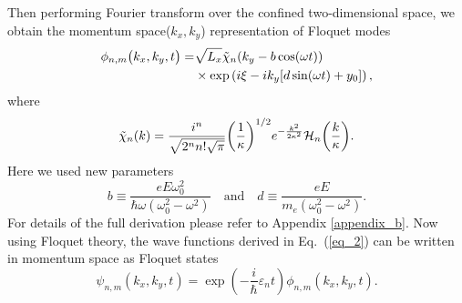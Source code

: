 Then performing Fourier transform over the confined two-dimensional space, we obtain the momentum space($k_x,k_y$) representation of Floquet modes
\begin{equation} \label{eq_9}
  \begin{aligned}
    \phi_{n,m}\big(k_x,k_y,t\big)  = &
    {\sqrt{L_x}}
    \tilde{\chi}_{n}\qty(k_y - b\cos(\omega t)) \\
    & \times
    \text{exp}\left(
      i\xi
      -ik_y  \qty[d\sin(\omega t) + y_0]
    \right),
  \end{aligned}
\end{equation}
where
\begin{equation} \label{eq_10}
  \tilde{\chi}_{n}\qty(k) =
  \frac{i^n}{\sqrt{2^{n} n! \sqrt{\pi}}}
  \qty(\frac{1}{\kappa})^{1/2}
  e^{-\frac{k^2}{2 \kappa^2}}
  \mathcal{H}_{n} \qty(\frac{k}{\kappa}).
\end{equation}
Here we used new parameters
\begin{equation} \label{eq_11}
  b \equiv
  \frac{eE\omega_0^2}{\hbar\omega(\omega_0^2 - \omega^2)} \quad \text{and} \quad
  d \equiv
 \frac{eE}{m_e(\omega_0^2 - \omega^2)}.
\end{equation}
For details of the full derivation please refer to Appendix \ref{appendix_b}. Now using Floquet theory, the wave functions derived in Eq.~(\ref{eq_2}) can be written in momentum space as Floquet states
\begin{equation} \label{eq_12}
  \psi_{n,m}(k_x,k_y,t) =
  \exp(-\frac{i}{\hbar}\varepsilon_{n}t)   \phi_{n,m} (k_x,k_y,t).
\end{equation}

